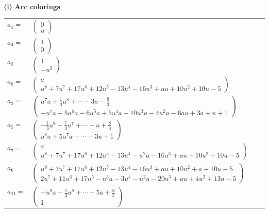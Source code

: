 \documentclass[1p]{elsarticle_modified}
\theoremstyle{definition}
\begin{document}
\flushleft \textbf{(i) Arc colorings}\\
\begin{tabular}{m{7pt} m{180pt} m{7pt} m{180pt} }
\flushright $a_{1}=$&$\begin{pmatrix}0\\u\end{pmatrix}$ \\
\flushright $a_{4}=$&$\begin{pmatrix}1\\0\end{pmatrix}$ \\
\flushright $a_{3}=$&$\begin{pmatrix}1\\- u^2\end{pmatrix}$ \\
\flushright $a_{8}=$&$\begin{pmatrix}a\\u^8+7 u^7+17 u^6+12 u^5-13 u^4-16 u^3+a u+10 u^2+10 u-5\end{pmatrix}$ \\
\flushright $a_{2}=$&$\begin{pmatrix}u^7 a+\frac{1}{3} u^8+\cdots-3 a-\frac{8}{3}\\- u^7 a-5 u^6 a-6 u^5 a+5 u^4 a+10 u^3 a-4 u^2 a-6 a u+3 a+u+1\end{pmatrix}$ \\
\flushright $a_{5}=$&$\begin{pmatrix}-\frac{1}{3} u^8-\frac{7}{3} u^7+\cdots- a+\frac{8}{3}\\u^8 a+5 u^7 a+\cdots-3 u+1\end{pmatrix}$ \\
\flushright $a_{7}=$&$\begin{pmatrix}a\\u^8+7 u^7+17 u^6+12 u^5-13 u^4- u^2 a-16 u^3+a u+10 u^2+10 u-5\end{pmatrix}$ \\
\flushright $a_{6}=$&$\begin{pmatrix}u^8+7 u^7+17 u^6+12 u^5-13 u^4-16 u^3+a u+10 u^2+a+10 u-5\\2 u^7+11 u^6+17 u^5- u^3 a-3 u^4- u^2 a-20 u^3+a u+4 u^2+13 u-5\end{pmatrix}$ \\
\flushright $a_{11}=$&$\begin{pmatrix}- u^8 a-\frac{1}{3} u^8+\cdots+5 a+\frac{8}{3}\\1\end{pmatrix}$ \\

\end{tabular}
\end{document}
